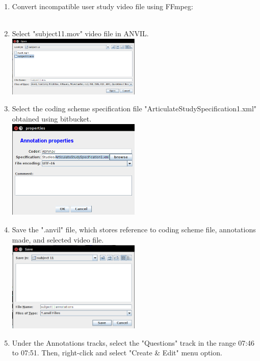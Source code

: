 \documentclass[]{article}
\begin{document}
\begin{enumerate}
\item Convert incompatible user study video file using FFmpeg: \\
 \\

\item Select "subject11.mov" video file in ANVIL. \\
\includegraphics[width=0.5\textwidth]{choose_video_file.png}

\item Select the coding scheme specification file "ArticulateStudySpecification1.xml" obtained using bitbucket. \\
\includegraphics[width=0.5\textwidth]{choose_coding_scheme.png}

\item Save the ".anvil" file, which stores reference to coding scheme file, annotations made, and selected video file. \\
\includegraphics[width=0.5\textwidth]{save_annotations_file.png}

\item Under the Annotations tracks, select the "Questions" track in the range 07:46 to 07:51. Then, right-click and select "Create \& Edit" menu option.


\end{enumerate}
\end{document}
